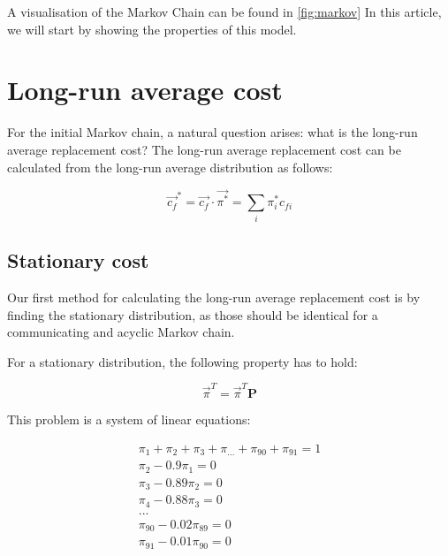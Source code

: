\documentclass{uniarticle}
\begin{document}
A visualisation of the Markov Chain can be found in \cref{fig:markov}
In this article, we will start by showing the properties of this model.

%     

\section{Long-run average cost}

For the initial Markov chain, a natural question arises: what is the long-run
average replacement cost? The long-run average replacement cost can be
calculated from the long-run average distribution as follows:

\begin{equation}\label{eq:stationary-cost}
    \vec{c_f}^* = \vec{c_f} \cdot \vec{\pi^*} = \sum_i \pi^*_i c_{fi}
\end{equation}

\subsection{Stationary cost}

Our first method for calculating the long-run average replacement cost is by
finding the stationary distribution, as those should be identical for a
communicating and acyclic Markov chain.

For a stationary distribution, the following property has to hold:

\begin{equation}
    \vec{\pi}^T = \vec{\pi}^T \mathbf{P}
\end{equation}

This problem is a system of linear equations:

\begin{equation}
  \begin{gathered}
    \pi_1 + \pi_2 + \pi_3 + \pi_{\text{...}} + \pi_{90} + \pi_{91} = 1 \\
    \pi_2 - 0.9\pi_1 = 0 \\
    \pi_3 - 0.89\pi_2 = 0 \\
    \pi_4 - 0.88\pi_3 = 0 \\
    \text{...} \\
    \pi_{90} - 0.02\pi_{89} = 0 \\
    \pi_{91} - 0.01\pi_{90} = 0
  \end{gathered}
\end{equation}
\end{document}

